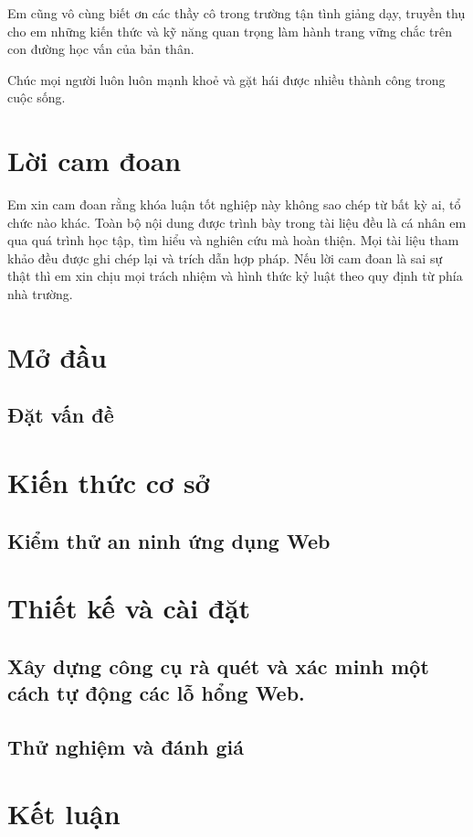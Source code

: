 \documentclass[12pt,a4paper]{report}
\begin{document}
Em cũng vô cùng biết ơn các thầy cô trong trường tận tình giảng dạy, truyền thụ cho em những kiến thức và kỹ năng quan trọng làm hành trang vững chắc trên con đường học vấn của bản thân.

Chúc mọi người luôn luôn mạnh khoẻ và gặt hái được nhiều thành công trong cuộc sống.

\chapter*{Lời cam đoan}

Em xin cam đoan rằng khóa luận tốt nghiệp này không sao chép từ bất kỳ ai, tổ chức nào khác. Toàn bộ nội dung được trình bày trong tài liệu đều là cá nhân em qua quá trình học tập, tìm hiểu và nghiên cứu mà hoàn thiện. Mọi tài liệu tham khảo đều được ghi chép lại và trích dẫn hợp pháp. Nếu lời cam đoan là sai sự thật thì em xin chịu mọi trách nhiệm và hình thức kỷ luật theo quy định từ phía nhà trường.

\tableofcontents{}
\clearpage{}

\listoffigures{}

\listoftables{}

\chapter{Mở đầu}

\section{Đặt vấn đề}


\chapter{Kiến thức cơ sở}

\section{Kiểm thử an ninh ứng dụng Web}


\chapter{Thiết kế và cài đặt}
\section{Xây dựng công cụ rà quét và xác minh một cách tự động các lỗ hổng Web.}


\section{Thử nghiệm và đánh giá}


\chapter{Kết luận}



\nocite{*}
\printbibliography[heading=bibintoc, title=Tài liệu tham khảo]

\end{document}
